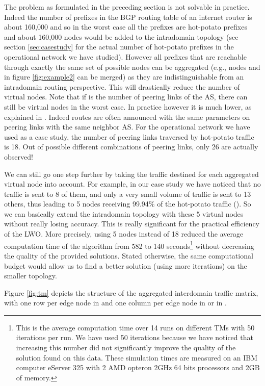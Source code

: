 \documentclass{acm_proc_article-sp}
\begin{document}
The problem as formulated in the preceding
section is not solvable in practice. Indeed the number of prefixes in the BGP
routing table of an internet router is about 160,000 and so in the worst
case all the prefixes are hot-potato prefixes and about 160,000 nodes would
be added to the intradomain topology (see section \ref{sec:casestudy}
for the actual number of hot-potato prefixes in the operational
network we have studied).
However all prefixes that are reachable through exactly the same set of possible nodes  can be
aggregated (e.g., nodes  and  in
figure \ref{fig:example2} can be merged) as they are indistinguishable 
from an intradomain routing perspective.
This will drastically reduce the number of virtual
nodes. Note that if  is the number of peering links of
the AS, there can still be  virtual nodes in the worst case. 
In practice however it is much lower, as explained in
\cite{feamster2}. Indeed routes are often announced with the same parameters on
peering links with the same neighbor AS.
For the operational network we have used as a case study, 
the number of peering links traversed by hot-potato traffic is 18. 
Out of  possible different combinations of peering
links, only 26 are actually observed!

We can still go one step further by taking the traffic destined for each
aggregated virtual node into account. For example, in our case study we have noticed that no traffic
is sent to 8 of them, and only a very small volume of traffic is sent to 13 others, 
thus leading to 5 nodes receiving 99.94\% of the hot-potato traffic (). 
So we can basically extend the intradomain topology with these 5 virtual nodes 
without really losing accuracy. This is really significant for the practical efficiency of the LWO.
More precisely, using 5 nodes instead of 18 reduced the average computation time of the algorithm from 582 to 140
seconds\footnote{This is the average computation time 
over 14 runs on different TMs with 50 iterations per run. We have used
50 iterations because we have noticed that increasing this number did
not significantly improve the quality of the solution found on this data. These
simulation times are measured on an IBM computer eServer
325 with 2 AMD opteron 2GHz 64 bits processors and 2GB of memory.} 
without decreasing the quality of the provided solutions.
Stated otherwise, the same computational budget would allow us to find 
a better solution (using more iterations) on the smaller topology.

Figure \ref{fig:tm} depicts the structure of the aggregated
interdomain traffic matrix, with one row per edge node in 
and one column per edge node in  or in .
\end{document}
